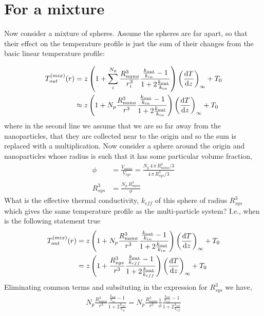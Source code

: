 \documentclass{article}
\begin{document}
\section{For a mixture}
Now consider a mixture of spheres. Assume the spheres are far apart,
so that their effect on the temperature profile is just the sum of
their changes from the basic linear temperature profile:

\begin{align}
  T_{out}^{(mix)}(r) &=z\left(1+\sum_{i}^{N_p}\frac{R_{nano}^3}{r^{3}_i}\frac{\frac{k_{out}}{k_{in}}-1}{1+2\frac{k_{out}}{k_{in}}}\right)\left(\frac{{\rm d}T}{{\rm d}
                    z}\right)_{\infty}  + T_0
  \\
 &\approx z\left(1+N_p\frac{R_{nano}^3}{r^{3}}\frac{\frac{k_{out}}{k_{in}}-1}{1+2\frac{k_{out}}{k_{in}}}\right)\left(\frac{{\rm d}T}{{\rm d}
                  z}\right)_{\infty}  + T_0
\end{align}
where in the second line we assume that we are so far away from the
nanoparticles, that they are collected near to the origin and so the
sum is replaced with a multiplication. Now consider a sphere around
the origin and nanoparticles whose radius is such that it has some
particular volume fraction,
\begin{align*}
  \phi &= \frac{V_{nano}}{V_{sys}}=\frac{N_p\,4\,\pi\,R^3_{nano}/3}{4\,\pi\,R^3_{sys}/3}
  \\
  R^3_{sys}&= \frac{N_p\,R^3_{nano}}{\phi}
\end{align*}
What is the effective thermal conductivity, $k_{eff}$ of this sphere
of radius $R_{sys}^3$ which gives the same temperature profile as the
multi-particle system? I.e., when is the following statement true
\begin{align*}
  T_{out}^{(mix)}(r) &=z\left(1+N_p\frac{R_{nano}^3}{r^{3}}\frac{\frac{k_{out}}{k_{in}}-1}{1+2\frac{k_{out}}{k_{in}}}\right)\left(\frac{{\rm d}T}{{\rm d}z}\right)_{\infty}  + T_0
  \\
  &=z\left(1+\frac{R_{sys}^3}{r^{3}}\frac{\frac{k_{out}}{k_{eff}}-1}{1+2\frac{k_{out}}{k_{eff}}}\right)\left(\frac{{\rm d}T}{{\rm d}z}\right)_{\infty}  + T_0
\end{align*}
Eliminating common terms and subsituting in the expression for
$R^3_{sys}$ we have,
\begin{align*}
  N_p\frac{R_{nano}^3}{r^{3}}\frac{\frac{k_{out}}{k_{in}}-1}{1+2\frac{k_{out}}{k_{in}}} = N_p\frac{R^3_{nano}}{r^{3}}\frac{1}{\phi}\frac{\frac{k_{out}}{k_{eff}}-1}{1+2\frac{k_{out}}{k_{eff}}}
\end{align*}
\end{document}
